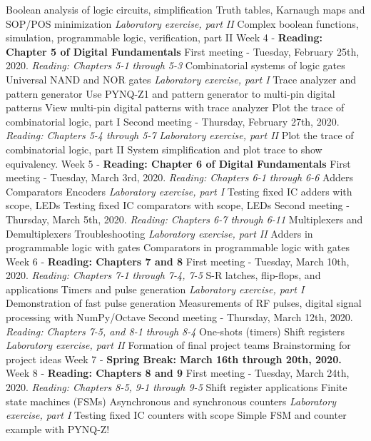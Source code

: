 \documentclass[10pt]{article}
\begin{document}
\begin{outline}[enumerate]
\3 Boolean analysis of logic circuits, simplification
\3 Truth tables, Karnaugh maps and SOP/POS minimization
\3 \textit{Laboratory exercise, part II}
\4 Complex boolean functions, simulation, programmable logic, verification, part II
\1 Week 4 - \textbf{Reading: Chapter 5 of Digital Fundamentals}
\2 First meeting - Tuesday, February 25th, 2020. \textit{Reading:  Chapters 5-1 through 5-3}
\3 Combinatorial systems of logic gates
\3 Universal NAND and NOR gates
\3 \textit{Laboratory exercise, part I}
\4 Trace analyzer and pattern generator
\4 Use PYNQ-Z1 and pattern generator to multi-pin digital patterns
\4 View multi-pin digital patterns with trace analyzer
\4 Plot the trace of combinatorial logic, part I
\2 Second meeting - Thursday, February 27th, 2020. \textit{Reading: Chapters 5-4 through 5-7}
\3 \textit{Laboratory exercise, part II}
\4 Plot the trace of combinatorial logic, part II
\4 System simplification and plot trace to show equivalency.
\1 Week 5 - \textbf{Reading: Chapter 6 of Digital Fundamentals}
\2 First meeting - Tuesday, March 3rd, 2020. \textit{Reading: Chapters 6-1 through 6-6}
\3 Adders
\3 Comparators
\3 Encoders
\3 \textit{Laboratory exercise, part I}
\4 Testing fixed IC adders with scope, LEDs
\4 Testing fixed IC comparators with scope, LEDs
\2 Second meeting - Thursday, March 5th, 2020. \textit{Reading: Chapters 6-7 through 6-11}
\3 Multiplexers and Demultiplexers
\3 Troubleshooting
\3 \textit{Laboratory exercise, part II}
\4 Adders in programmable logic with gates
\4 Comparators in programmable logic with gates
\1 Week 6 - \textbf{Reading: Chapters 7 and 8}
\2 First meeting - Tuesday, March 10th, 2020. \textit{Reading: Chapters 7-1 through 7-4, 7-5}
\3 S-R latches, flip-flops, and applications
\3 Timers and pulse generation
\3 \textit{Laboratory exercise, part I}
\4 Demonstration of fast pulse generation
\4 Measurements of RF pulses, digital signal processing with NumPy/Octave
\2 Second meeting - Thursday, March 12th, 2020. \textit{Reading: Chapters 7-5, and 8-1 through 8-4}
\3 One-shots (timers)
\3 Shift registers
\3 \textit{Laboratory exercise, part II}
\4 Formation of final project teams
\4 Brainstorming for project ideas
\1 Week 7 - \textbf{Spring Break: March 16th through 20th, 2020.}
\1 Week 8 - \textbf{Reading: Chapters 8 and 9}
\2 First meeting - Tuesday, March 24th, 2020. \textit{Reading: Chapters 8-5, 9-1 through 9-5}
\3 Shift register applications
\3 Finite state machines (FSMs)
\3 Asynchronous and synchronous counters
\3 \textit{Laboratory exercise, part I}
\4 Testing fixed IC counters with scope
\4 Simple FSM and counter example with PYNQ-Z!

\end{outline}
\end{document}
